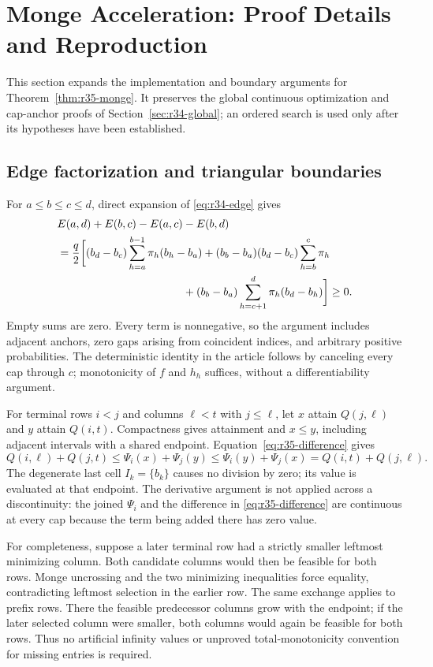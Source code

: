 \section{Monge Acceleration: Proof Details and Reproduction}\label{sec:ec-r35}
This section expands the implementation and boundary arguments for Theorem~\ref{thm:r35-monge}. It preserves the global continuous optimization and cap-anchor proofs of Section~\ref{sec:r34-global}; an ordered search is used only after its hypotheses have been established.

\subsection{Edge factorization and triangular boundaries}
For $a\leq b\leq c\leq d$, direct expansion of \eqref{eq:r34-edge} gives
\begin{align*}
 &E(a,d)+E(b,c)-E(a,c)-E(b,d)\\
 &=\frac q2\biggl[(b_d-b_c)\sum_{h=a}^{b-1}\pi_h(b_h-b_a)
 +(b_b-b_a)(b_d-b_c)\sum_{h=b}^{c}\pi_h\\
 &\hspace{40mm}+(b_b-b_a)\sum_{h=c+1}^{d}\pi_h(b_d-b_h)\biggr]\geq0.
\end{align*}
Empty sums are zero. Every term is nonnegative, so the argument includes adjacent anchors, zero gaps arising from coincident indices, and arbitrary positive probabilities. The deterministic identity in the article follows by canceling every cap through $c$; monotonicity of $f$ and $h_h$ suffices, without a differentiability argument.

For terminal rows $i<j$ and columns $\ell<t$ with $j\leq\ell$, let $x$ attain $Q(j,\ell)$ and $y$ attain $Q(i,t)$. Compactness gives attainment and $x\leq y$, including adjacent intervals with a shared endpoint. Equation~\eqref{eq:r35-difference} gives
\[
 Q(i,\ell)+Q(j,t)
 \leq\Psi_i(x)+\Psi_j(y)
 \leq\Psi_i(y)+\Psi_j(x)
 =Q(i,t)+Q(j,\ell).
\]
The degenerate last cell $I_k=\{b_k\}$ causes no division by zero; its value is evaluated at that endpoint. The derivative argument is not applied across a discontinuity: the joined $\Psi_i$ and the difference in \eqref{eq:r35-difference} are continuous at every cap because the term being added there has zero value.

For completeness, suppose a later terminal row had a strictly smaller leftmost minimizing column. Both candidate columns would then be feasible for both rows. Monge uncrossing and the two minimizing inequalities force equality, contradicting leftmost selection in the earlier row. The same exchange applies to prefix rows. There the feasible predecessor columns grow with the endpoint; if the later selected column were smaller, both columns would again be feasible for both rows. Thus no artificial infinity values or unproved total-monotonicity convention for missing entries is required.

